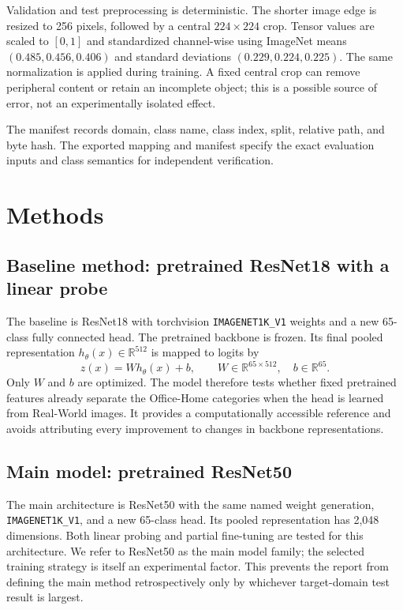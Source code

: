\documentclass[10pt,a4paper]{article}
\begin{document}
Validation and test preprocessing is deterministic. The shorter image edge is resized to 256 pixels, followed by a central $224\times224$ crop. Tensor values are scaled to $[0,1]$ and standardized channel-wise using ImageNet means $(0.485,0.456,0.406)$ and standard deviations $(0.229,0.224,0.225)$. The same normalization is applied during training. A fixed central crop can remove peripheral content or retain an incomplete object; this is a possible source of error, not an experimentally isolated effect.

The manifest records domain, class name, class index, split, relative path, and byte hash. The exported mapping and manifest specify the exact evaluation inputs and class semantics for independent verification.


\section{Methods}
\subsection{Baseline method: pretrained ResNet18 with a linear probe}
The baseline is ResNet18 with torchvision \texttt{IMAGENET1K\_V1} weights and a new 65-class fully connected head. The pretrained backbone is frozen. Its final pooled representation $h_\theta(x)\in\mathbb{R}^{512}$ is mapped to logits by
\begin{equation}
z(x)=Wh_\theta(x)+b,\qquad W\in\mathbb{R}^{65\times512},\quad b\in\mathbb{R}^{65}.
\end{equation}
Only $W$ and $b$ are optimized. The model therefore tests whether fixed pretrained features already separate the Office-Home categories when the head is learned from Real-World images. It provides a computationally accessible reference and avoids attributing every improvement to changes in backbone representations.

\subsection{Main model: pretrained ResNet50}
The main architecture is ResNet50 with the same named weight generation, \texttt{IMAGENET1K\_V1}, and a new 65-class head. Its pooled representation has 2,048 dimensions. Both linear probing and partial fine-tuning are tested for this architecture. We refer to ResNet50 as the main model family; the selected training strategy is itself an experimental factor. This prevents the report from defining the main method retrospectively only by whichever target-domain test result is largest.
\end{document}

